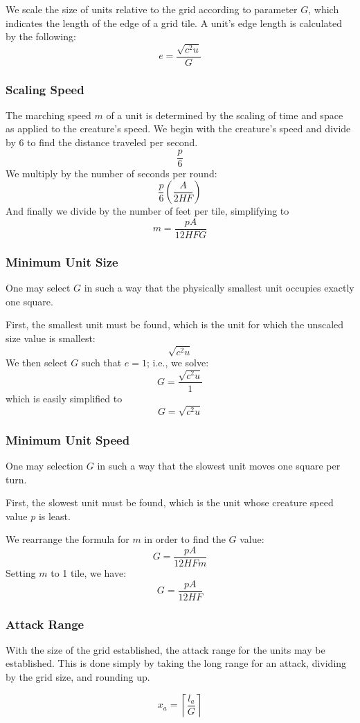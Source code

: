 We scale the size of units relative to the grid
according to parameter $G$,
which indicates the length of the edge of a grid tile.
A unit's edge length is calculated by the following:
\[
    e = \frac
        {\sqrt{c^2 u}}
        {G}
\]

\subsubsection{Scaling Speed}
The marching speed $m$ of a unit is determined
by the scaling of time and space
as applied to the creature's speed.
We begin with the creature's speed and divide by 6
to find the distance traveled per second.
\[
    \frac
        {p}
        {6}
\]
We multiply by the number of seconds per round:
\[
    \frac
        {p}
        {6}
    \left(
        \frac
            {A}
            {2 H F}
    \right)
\]
And finally we divide by the number of feet per tile,
simplifying to
\[
    m = \frac
        {p A}
        {12 H F G}
\]

\subsubsection{Minimum Unit Size}

One may select $G$ in such a way that the physically smallest unit
occupies exactly one square.

First, the smallest unit must be found,
which is the unit for which the unscaled size value is smallest:
\[
    \sqrt{c^2 u}
\]
We then select $G$ such that $e = 1$;
i.e., we solve:
\[
    G = \frac
            {\sqrt{c^2 u}}
            {1}
\]
which is easily simplified to
\[
    G = \sqrt{c^2 u}
\]

\subsubsection{Minimum Unit Speed}

One may selection $G$ in such a way that the slowest unit moves one square per turn.

First, the slowest unit must be found,
which is the unit whose creature speed value $p$ is least.

We rearrange the formula for $m$ in order to find the $G$ value:
\[
    G = \frac
            {p A}
            {12 H F m}
\]
Setting $m$ to 1 tile, we have:
\[
    G = \frac
            {p A}
            {12 H F}
\]

\subsubsection{Attack Range}

With the size of the grid established, the attack range for the units may be established.
This is done simply by taking the long range for an attack,
dividing by the grid size,
and rounding up.

\[
    x_a = \left\lceil\frac
        {l_a}
        {G}
        \right\rceil
\]

